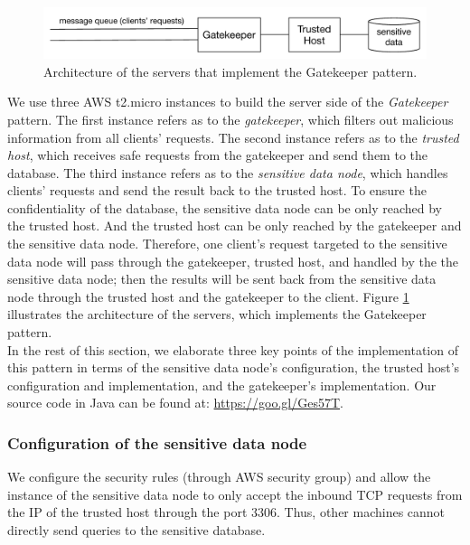 \documentclass{article}
\begin{document}
\begin{figure}[t]
    \centering
        \includegraphics[width = \columnwidth]{images/gatekeeper.pdf}
    \caption{Architecture of the servers that implement the Gatekeeper pattern.}
    \label{fig:arch2}
\end{figure}

We use three AWS t2.micro instances to build the server side of the \emph{Gatekeeper} pattern. The first instance refers as to the \emph{gatekeeper}, which filters out malicious information from all clients' requests. The second instance refers as to the \emph{trusted host}, which receives safe requests from the gatekeeper and send them to the database. The third instance refers as to the \emph{sensitive data node}, which handles clients' requests and send the result back to the trusted host. To ensure the confidentiality of the database, the sensitive data node can be only reached by the trusted host. And the trusted host can be only reached by the gatekeeper and the sensitive data node. Therefore, one client's request targeted to the sensitive data node will pass through the gatekeeper, trusted host, and handled by the the sensitive data node; then the results will be sent back from the sensitive data node through the trusted host and the gatekeeper to the client. Figure \ref{fig:arch2} illustrates the architecture of the servers, which implements the Gatekeeper pattern.\\

In the rest of this section, we elaborate three key points of the implementation of this pattern in terms of the sensitive data node's configuration, the trusted host's configuration and implementation, and the gatekeeper's implementation. Our source code in Java can be found at: \url{https://goo.gl/Ges57T}.

\subsubsection{Configuration of the sensitive data node}
We configure the security rules (through AWS security group) and allow the instance of the sensitive data node to only accept the inbound TCP requests from the IP of the trusted host through the port 3306. Thus, other machines cannot directly send queries to the sensitive database.
\end{document}

